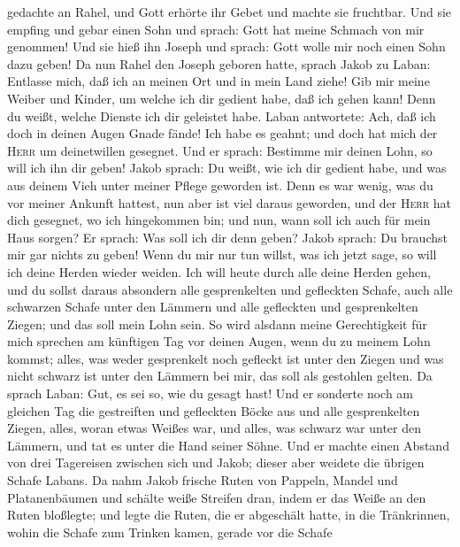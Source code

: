 gedachte an Rahel, und Gott erhörte ihr Gebet und machte sie fruchtbar.
 Und sie empfing und gebar einen Sohn und sprach: Gott
hat meine Schmach von mir genommen!  Und sie hieß ihn
Joseph und sprach: Gott wolle mir noch einen Sohn dazu geben!
 Da nun Rahel den Joseph geboren hatte, sprach Jakob zu
Laban: Entlasse mich, daß ich an meinen Ort und in mein Land ziehe!
 Gib mir meine Weiber und Kinder, um welche ich dir
gedient habe, daß ich gehen kann! Denn du weißt, welche Dienste ich dir
geleistet habe.  Laban antwortete: Ach, daß ich doch in
deinen Augen Gnade fände! Ich habe es geahnt; und doch hat mich der
\textsc{Herr} um deinetwillen gesegnet.  Und er sprach:
Bestimme mir deinen Lohn, so will ich ihn dir geben! 
Jakob sprach: Du weißt, wie ich dir gedient habe, und was aus deinem
Vieh unter meiner Pflege geworden ist.  Denn es war
wenig, was du vor meiner Ankunft hattest, nun aber ist viel daraus
geworden, und der \textsc{Herr} hat dich gesegnet, wo ich hingekommen
bin; und nun, wann soll ich auch für mein Haus sorgen? 
Er sprach: Was soll ich dir denn geben? Jakob sprach: Du brauchst mir
gar nichts zu geben! Wenn du mir nur tun willst, was ich jetzt sage, so
will ich deine Herden wieder weiden.  Ich will heute
durch alle deine Herden gehen, und du sollst daraus absondern alle
gesprenkelten und gefleckten Schafe, auch alle schwarzen Schafe unter
den Lämmern und alle gefleckten und gesprenkelten Ziegen; und das soll
mein Lohn sein.  So wird alsdann meine Gerechtigkeit für
mich sprechen am künftigen Tag vor deinen Augen, wenn du zu meinem Lohn
kommst; alles, was weder gesprenkelt noch gefleckt ist unter den Ziegen
und was nicht schwarz ist unter den Lämmern bei mir, das soll als
gestohlen gelten.  Da sprach Laban: Gut, es sei so, wie
du gesagt hast!  Und er sonderte noch am gleichen Tag die
gestreiften und gefleckten Böcke aus und alle gesprenkelten Ziegen,
alles, woran etwas Weißes war, und alles, was schwarz war unter den
Lämmern, und tat es unter die Hand seiner Söhne.  Und er
machte einen Abstand von drei Tagereisen zwischen sich und Jakob; dieser
aber weidete die übrigen Schafe Labans.  Da nahm Jakob
frische Ruten von Pappeln, Mandel und Platanenbäumen und schälte weiße
Streifen dran, indem er das Weiße an den Ruten bloßlegte;
 und legte die Ruten, die er abgeschält hatte, in die
Tränkrinnen, wohin die Schafe zum Trinken kamen, gerade vor die Schafe
